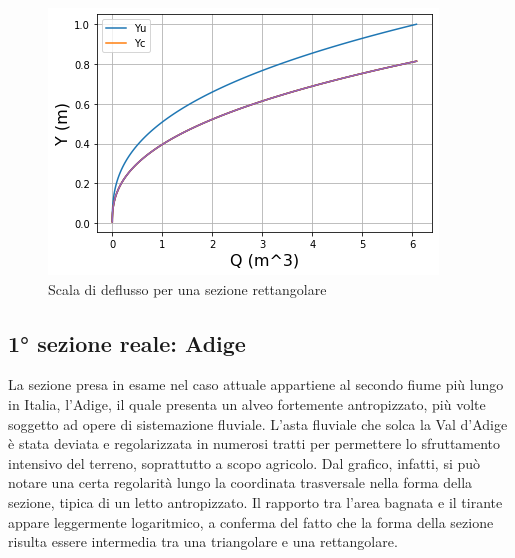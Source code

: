 \documentclass[12pt]{article} %
\begin{document}
\begin{figure}[H]
    \centering
    \includegraphics[scale=0.8]{deflussotri.png}
    \caption{Scala di deflusso per una sezione rettangolare}
    \label{fig:rettangolare_scala_deflusso}
\end{figure}

\subsection{1° sezione reale: Adige}
\noindent La sezione presa in esame nel caso attuale appartiene al secondo fiume più lungo in Italia, l’Adige, il quale presenta un alveo fortemente antropizzato, più volte soggetto ad opere di sistemazione fluviale. 
L’asta fluviale che solca la Val d’Adige è stata deviata e regolarizzata in numerosi tratti per permettere lo sfruttamento intensivo del terreno, soprattutto a scopo agricolo. 
Dal grafico, infatti, si può notare una certa regolarità lungo la coordinata trasversale nella forma della sezione, tipica di un letto antropizzato. Il rapporto tra l’area bagnata e il tirante appare leggermente logaritmico, a conferma del fatto che la forma della sezione risulta essere intermedia tra una triangolare e una rettangolare.
\end{document}
